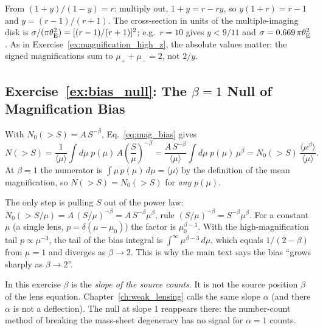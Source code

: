\begin{derivation}
From $(1+y)/(1-y) = r$: multiply out, $1 + y = r - ry$, so
$y(1+r) = r-1$ and $y = (r-1)/(r+1)$.  The cross-section in units of the
multiple-imaging disk is $\sigma/(\pi\theta_{\mathrm{E}}^2) = [(r-1)/(r+1)]^2$; e.g.\
$r = 10$ gives $y < 9/11$ and $\sigma = 0.669\,\pi\theta_{\mathrm{E}}^2$.  As
in Exercise~\ref{ex:magnification_high_z}, the absolute values matter: the signed magnifications sum
to $\mu_+ + \mu_- = 2$, not $2/y$.
\end{derivation}

\subsection*{Exercise~\ref{ex:bias_null}: The $\beta=1$ Null of Magnification Bias}

With $N_0(>S) = A\,S^{-\beta}$, Eq.~\eqref{eq:mag_bias} gives
\[
    N(>S) = \frac{1}{\langle\mu\rangle}\int d\mu\; p(\mu)\,
    A\left(\frac{S}{\mu}\right)^{-\beta}
    = \frac{A\,S^{-\beta}}{\langle\mu\rangle}
      \int d\mu\; p(\mu)\,\mu^{\beta}
    = N_0(>S)\,\frac{\langle\mu^{\beta}\rangle}{\langle\mu\rangle}.
\]
At $\beta = 1$ the numerator is
$\int \mu\,p(\mu)\,d\mu = \langle\mu\rangle$ by the definition of the mean
magnification, so $N(>S) = N_0(>S)$ for \emph{any} $p(\mu)$. \checkmark

\begin{derivation}[Exercise~\ref{ex:bias_null}, the substitution]
The only step is pulling $S$ out of the power law:
$N_0(>S/\mu) = A\,(S/\mu)^{-\beta} = A\,S^{-\beta}\mu^{\beta}$, rule
$(S/\mu)^{-\beta} = S^{-\beta}\mu^{\beta}$.  For a constant $\mu$ (a single
lens, $p = \delta(\mu - \mu_0)$) the factor is $\mu_0^{\beta-1}$.  With the
high-magnification tail $p \propto \mu^{-3}$, the tail of the bias
integral is $\int^\infty \mu^{\beta-3}\,d\mu$, which equals $1/(2-\beta)$
from $\mu = 1$ and diverges as $\beta \to 2$.  This is why the main text says
the bias ``grows sharply as $\beta \to 2$''.
\end{derivation}

\begin{annotation}
In this exercise $\beta$ is the \emph{slope of the source counts}.  It is not
the source position $\beta$ of the lens equation.  Chapter~\ref{ch:weak_lensing}
calls the same slope $\alpha$ (and there $\alpha$ is not a deflection).  The
null at slope 1 reappears there: the number-count method of breaking the
mass-sheet degeneracy has no signal for $\alpha = 1$ counts.
\end{annotation}

